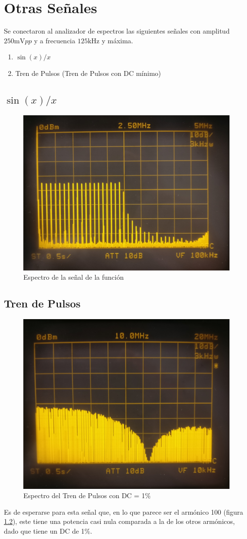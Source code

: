 \chapter{Otras Señales}
Se conectaron al analizador de espectros las siguientes
señales con amplitud $250\si{\milli\volt}pp$ y a frecuencia
$125\si{\kilo\hertz}$ y máxima.

\begin{enumerate}
    \item $\sin(x)/x$
    \item Tren de Pulsos (Tren de Pulsos con DC mínimo)
\end{enumerate}

\section{$\sin(x)/x$}
\begin{figure}[ht]
    \begin{center}
        \includegraphics[width=0.6\linewidth]{contenido/img/espectro_sinx.jpg}
        \caption{Espectro de la señal de la función}
        \label{fig:espectro_sin}
    \end{center}
\end{figure}

\newpage
\section{Tren de Pulsos}

\begin{figure}[ht]
    \begin{center}
        \includegraphics[width=0.6\linewidth]{contenido/img/espectro_dc01.jpg}
        \caption{Espectro del Tren de Pulsos con DC = 1\%}
         \label{fig:espectro_tren}
    \end{center}
\end{figure}

Es de esperarse para esta señal que, en lo que parece ser el armónico 100 (figura \ref{fig:espectro_tren}), este 
tiene una potencia casi nula comparada a la de los otros armónicos, dado que tiene un DC de 1\%.
